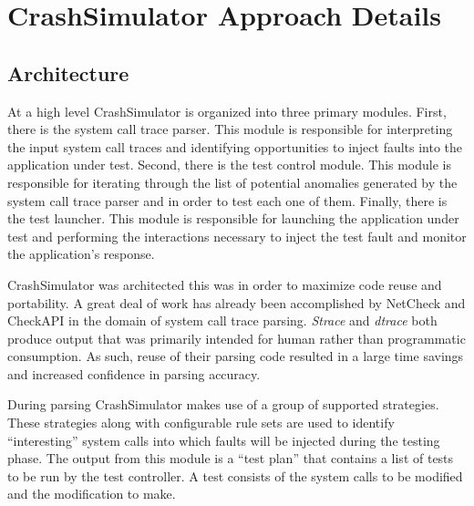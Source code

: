 
\section{CrashSimulator Approach Details}


    \subsection{Architecture}

        At a high level CrashSimulator is organized into three primary modules. First, there is the system call trace
        parser. This module is responsible for interpreting the input system call traces and identifying opportunities
        to inject faults into the application under test. Second, there is the test control module. This module is
        responsible for iterating through the list of potential anomalies generated by the system call trace parser and
        in order to test each one of them. Finally, there is the test launcher. This module is responsible for launching
        the application under test and performing the interactions necessary to inject the test fault and monitor the
        application's response.

        CrashSimulator was architected this was in order to maximize code reuse and portability. A great deal of work
        has already been accomplished by NetCheck and CheckAPI in the domain of system call trace parsing. \emph{Strace}
        and \emph{dtrace} both produce output that was primarily intended for human rather than programmatic
        consumption. As such, reuse of their parsing code resulted in a large time savings and increased confidence in
        parsing accuracy.

        During parsing CrashSimulator makes use of a group of supported strategies. These strategies along with
        configurable rule sets are used to identify ``interesting'' system calls into which faults will be injected
        during the testing phase. The output from this module is a ``test plan'' that contains a list of tests to be run
        by the test controller. A test consists of the system calls to be modified and the modification to make.

